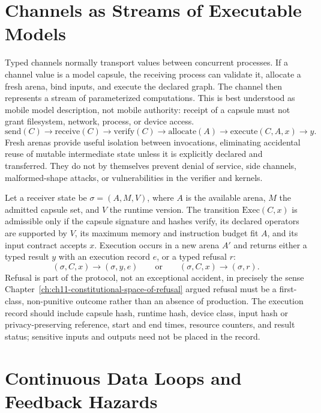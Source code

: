 \section{Channels as Streams of Executable Models}

Typed channels normally transport values between concurrent processes. If a channel value is a model capsule, the receiving process can validate it, allocate a fresh arena, bind inputs, and execute the declared graph. The channel then represents a stream of parameterized computations. This is best understood as mobile model description, not mobile authority: receipt of a capsule must not grant filesystem, network, process, or device access.
\[
\mathrm{send}(C) \to \mathrm{receive}(C) \to \mathrm{verify}(C) \to \mathrm{allocate}(A) \to \mathrm{execute}(C,A,x) \to y.
\]
Fresh arenas provide useful isolation between invocations, eliminating accidental reuse of mutable intermediate state unless it is explicitly declared and transferred. They do not by themselves prevent denial of service, side channels, malformed-shape attacks, or vulnerabilities in the verifier and kernels.

Let a receiver state be $\sigma = (A,M,V)$, where $A$ is the available arena, $M$ the admitted capsule set, and $V$ the runtime version. The transition $\mathrm{Exec}(C,x)$ is admissible only if the capsule signature and hashes verify, its declared operators are supported by $V$, its maximum memory and instruction budget fit $A$, and its input contract accepts $x$. Execution occurs in a new arena $A'$ and returns either a typed result $y$ with an execution record $e$, or a typed refusal $r$:
\[
(\sigma,C,x) \to (\sigma,y,e) \qquad \text{or} \qquad (\sigma,C,x) \to (\sigma,r).
\]
Refusal is part of the protocol, not an exceptional accident, in precisely the sense Chapter~\ref{ch:ch11-constitutional-space-of-refusal} argued refusal must be a first-class, non-punitive outcome rather than an absence of production. The execution record should include capsule hash, runtime hash, device class, input hash or privacy-preserving reference, start and end times, resource counters, and result status; sensitive inputs and outputs need not be placed in the record.

\section{Continuous Data Loops and Feedback Hazards}

